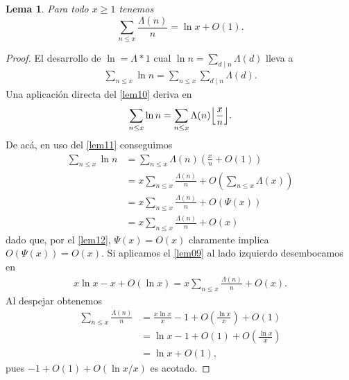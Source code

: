 \documentclass[10pt]{article}
\DeclarePairedDelimiter\floor{\lfloor}{\rfloor}
\newtheorem{lemma}[theorem]{Lema}
\theoremstyle{definition}
\theoremstyle{remark}
\begin{document}
\begin{lemma}\label{lem14}
Para todo $x \geq 1$ tenemos
\[
\sum_{n \leq x} \frac{\Lambda(n)}{n} = \ln x + O(1).
\]
\end{lemma}

\begin{proof}
El desarrollo de  $\ln = \Lambda * 1$ cual 
$\ln n = \sum_{d \mid n} \Lambda(d)$ 
lleva a
\begin{align}
\sum_{n \leq x} \ln n = \sum_{n \leq x} \sum_{d \mid n} \Lambda(d).
\end{align}
Una aplicaci\'on directa del \cref{lem10} deriva en 
\begin{align}
\sum_{n \leq x} \ln n = \sum_{n \leq x} \Lambda(n) \floor*{\frac{x}{n}}. 
\end{align}
De ac\'a, en uso del \cref{lem11} conseguimos
\begin{align}
\sum_{n \leq x} \ln n &= \sum_{n \leq x} \Lambda(n) \left(\frac{x}{n} + O(1)\right) \\
&= x \sum_{n \leq x} \frac{\Lambda(n)}{n} + O\left(\sum_{n \leq x} \Lambda(x) \right) \\
&= x \sum_{n \leq x} \frac{\Lambda(n)}{n} + O(\Psi(x)) \\
&= x \sum_{n \leq x} \frac{\Lambda(n)}{n} + O(x)
\end{align}
dado que, por el \cref{lem12}, $\Psi(x) = O(x)$ claramente implica $O(\Psi(x))=O(x)$. 
Si aplicamos el \cref{lem09} al lado izquierdo desembocamos en
\begin{align}
x\ln x - x + O(\ln x) = x \sum_{n \leq x} \frac{\Lambda(n)}{n} + O(x). 
\end{align}
Al despejar obtenemos 
\begin{align}
\sum_{n \leq x} \frac{\Lambda(n)}{n} &= \frac{x \ln x}{x} - 1 + O\left(\frac{\ln x}{x}\right) + O(1) \\
&= \ln x - 1 + O(1) + O\left(\frac{\ln x}{x}\right) \\
&= \ln x + O(1),
\end{align}
pues $-1 + O(1)+ O(\ln x/x)$ es acotado. 
\end{proof}
\end{document}
